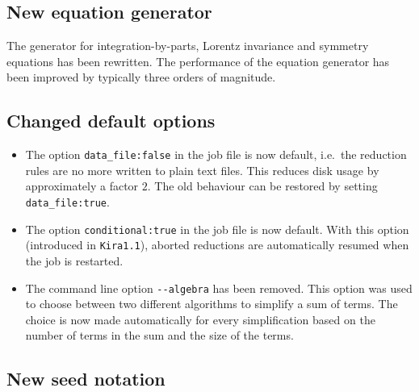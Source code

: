 \documentclass[a4paper,12pt]{article}
\newcommand*{\kira}{\texttt{Kira}}
\begin{document}
\subsection{New equation generator}

The generator for integration-by-parts, Lorentz invariance and symmetry
equations has been rewritten.
The performance of the equation generator has been improved by typically
three orders of magnitude.


\subsection{Changed default options}
\label{sect:defaultoptions}

\begin{itemize}
  \item The option \texttt{data\_file:\;false} in the job file is now default,
        i.e.\ the reduction rules are no more written to plain text files.
        This reduces disk usage by approximately a factor $2$.
        The old behaviour can be restored by setting \texttt{data\_file:\;true}.
  \item The option \texttt{conditional:\;true} in the job file is now default.
        With this option (introduced in \kira{}\;\texttt{1.1}), aborted
        reductions are automatically resumed when the job is restarted.
  \item The command line option \texttt{-{}-algebra} has been removed.
        This option was used to choose between two different algorithms to
        simplify a sum of terms.
        The choice is now made automatically for every simplification based on
        the number of terms in the sum and the size of the terms.
\end{itemize}


\subsection{New seed notation}
\label{seedselection}
\end{document}
